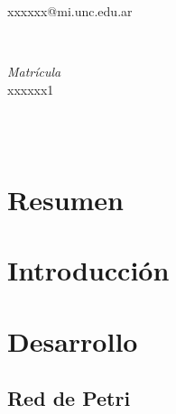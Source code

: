 \documentclass[12pt]{article}
\makeatletter
\let\thedate\@date
\makeatother
\begin{document}
\begin{titlepage}
\begin{minipage}{0.4\textwidth}
\begin{flushleft}
          {\small xxxxxx@mi.unc.edu.ar}\\ %
		\end{flushleft}
	\end{minipage}~
	\begin{minipage}{0.4\textwidth}
		\begin{flushright} \large
			\emph{Matrícula} \\
			xxxxxx1	\\%
            
		\end{flushright}	
	\end{minipage}\\[2 cm]
	
	
	{\large \thedate}\\[2 cm]
 
	\vfill
	
\end{titlepage}



\section*{Resumen}


\newpage

\tableofcontents %

\pagebreak
{}
\section{Introducción}
  
\pagebreak
\section{Desarrollo}
\subsection{Red de Petri}
\end{document}
